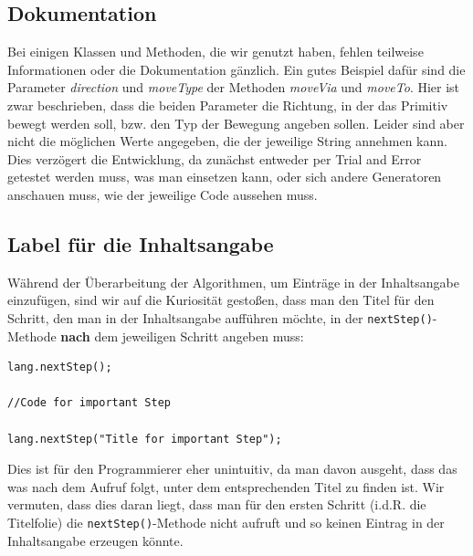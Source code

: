 \documentclass[nochapname]{tudexercise}
\begin{document}
		\subsection{Dokumentation}
			Bei einigen Klassen und Methoden, die wir genutzt haben, fehlen teilweise Informationen oder die Dokumentation gänzlich. Ein gutes Beispiel dafür sind die Parameter \textit{direction} und \textit{moveType} der Methoden \textit{moveVia} und \textit{moveTo}. Hier ist zwar beschrieben, dass die beiden Parameter die Richtung, in der das Primitiv bewegt werden soll, bzw. den Typ der Bewegung angeben sollen. Leider sind aber nicht die möglichen Werte angegeben, die der jeweilige String annehmen kann. Dies verzögert die Entwicklung, da zunächst entweder per Trial and Error getestet werden muss, was man einsetzen kann, oder sich andere Generatoren anschauen muss, wie der jeweilige Code aussehen muss.
		
		\subsection{Label für die Inhaltsangabe}
			Während der Überarbeitung der Algorithmen, um Einträge in der Inhaltsangabe einzufügen, sind wir auf die Kuriosität gestoßen, dass man den Titel für den Schritt, den man in der Inhaltsangabe aufführen möchte, in der \lstinline!nextStep()!-Methode \textbf{nach} dem jeweiligen Schritt angeben muss:
			\begin{lstlisting}[frame=single, caption = Code-Beispiel für die Angabe des Titels nach dem Code]
lang.nextStep();

//Code for important Step

lang.nextStep("Title for important Step");
			\end{lstlisting}
			Dies ist für den Programmierer eher unintuitiv, da man davon ausgeht, dass das was nach dem Aufruf folgt, unter dem entsprechenden Titel zu finden ist. Wir vermuten, dass dies daran liegt, dass man für den ersten Schritt (i.d.R. die Titelfolie) die \lstinline!nextStep()!-Methode nicht aufruft und so keinen Eintrag in der Inhaltsangabe erzeugen könnte.
		
\end{document}

